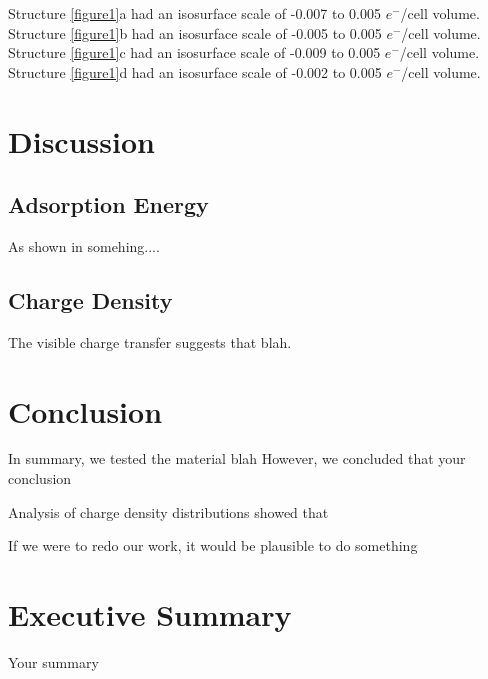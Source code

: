 \documentclass[letterpaper,showpacs,prb,preprint]{revtex4}
\begin{document}
Structure \ref{figure1}a had an isosurface scale of -0.007 to 0.005 $e^{-}$/cell volume. 
Structure \ref{figure1}b had an isosurface scale of -0.005 to 0.005 $e^{-}$/cell volume. 
Structure \ref{figure1}c had an isosurface scale of -0.009 to 0.005 $e^{-}$/cell volume. 
Structure \ref{figure1}d had an isosurface scale of -0.002 to 0.005 $e^{-}$/cell volume. 

\section{Discussion}

\subsection{Adsorption Energy}

As shown in somehing....

\subsection{Charge Density}

The visible charge transfer suggests that  blah.

\section{Conclusion}

In summary, we tested the material blah
However, we concluded that  your conclusion

Analysis of charge density distributions showed that

If we were to redo our work, it would be plausible to do something

\newpage

\section{Executive Summary}

Your summary

\newpage
{}

%
\end{document}
